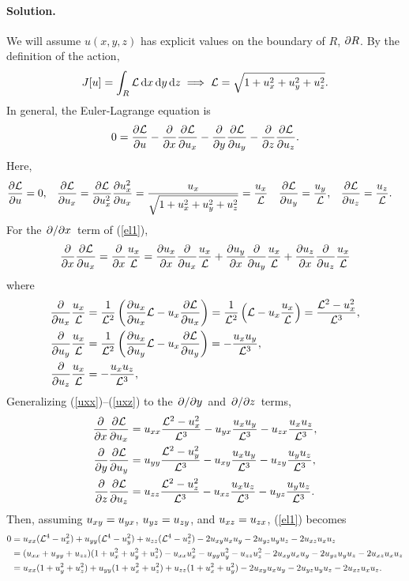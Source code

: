 \documentclass[11pt]{article}
\newcommand{\refeq}[1]{(\ref{#1})}
\newcommand{\beq}{\begin{equation*}}
\newcommand{\eeq}{\end{equation*}}
\newcommand{\beqn}{\begin{equation}}
\newcommand{\eeqn}{\end{equation}}
\newenvironment{solution}
{
    \paragraph{Solution.}
    \ignorespaces
}
{
}
\begin{document}
\begin{solution}
	We will assume $u(x, y, z)$ has explicit values on the boundary of $R$, $\partial R$.  By the definition of the action,
	\beq
		J[u] = \intr \Ld \dr \implies \Ld = \sqrt{1 + \ux^2 + \uy^2 + \uz^2}.
	\eeq
	In general, the Euler-Lagrange equation is
	\beqn \label{el1}
		0 = \pdv{\Ld}{u} - \pdv{}{x} \pdv{\Ld}{\ux} - \pdv{}{y} \pdv{\Ld}{\uy} - \pdv{}{z} \pdv{\Ld}{\uz}.
	\eeqn
	Here,
	\begin{align*}
		\pdv{\mathcal{L}}{u} &= 0, &
		\pdv{\mathcal{L}}{u_x} &= \pdv{\mathcal{L}}{u_x^2} \pdv{u_x^2}{u_x} = \frac{u_x}{\sqrt{1 + u_x^2 + u_y^2 + u_z^2}} = \frac{u_x}{\mathcal{L}} &
		\pdv{\mathcal{L}}{u_y} &= \frac{u_y}{\mathcal{L}}, &
		\pdv{\mathcal{L}}{u_z} &= \frac{u_z}{\mathcal{L}}.
	\end{align*}
	For the $\pdv*{}{x}$ term of \refeq{el1},
	\beq
		\pdv{}{x} \pdv{\Ld}{\ux} = \pdv{}{x} \frac{\ux}{\Ld} = \pdv{\ux}{x} \pdv{}{\ux} \frac{\ux}{\Ld} + \pdv{\uy}{x} \pdv{}{\uy} \frac{\ux}{\Ld} + \pdv{\uz}{x} \pdv{}{\uz} \frac{\ux}{\Ld}
	\eeq
	where
	\begin{align}
		\pdv{}{u_x} \frac{u_x}{\mathcal{L}} &= \frac{1}{\mathcal{L}^2} \left(\pdv{u_x}{u_x} \mathcal{L} - u_x \pdv{\mathcal{L}}{u_x} \right) = \frac{1}{\mathcal{L}^2} \left( \mathcal{L} - u_x \frac{u_x}{\mathcal{L}} \right) = \frac{\mathcal{L}^2 - u_x^2}{\mathcal{L}^3}, \label{uxx} \\
		\pdv{}{u_y} \frac{u_x}{\mathcal{L}} &= \frac{1}{\mathcal{L}^2} \left(\pdv{u_x}{u_y} \mathcal{L} - u_x \pdv{\mathcal{L}}{u_y} \right) = -\frac{u_x u_y}{\mathcal{L}^3}, \\
		\pdv{}{u_z} \frac{u_x}{\mathcal{L}} &= -\frac{u_x u_z}{\mathcal{L}^3}, \label{uxz}
	\end{align}
	Generalizing \refeq{uxx}--\refeq{uxz} to the $\pdv*{}{y}$ and $\pdv*{}{z}$ terms,
	\begin{align*}
		\pdv{}{x} \pdv{\mathcal{L}}{u_x} &= u_{xx} \frac{\mathcal{L}^2 - u_x^2}{\mathcal{L}^3} - u_{yx} \frac{u_x u_y}{\mathcal{L}^3} - u_{zx} \frac{u_x u_z}{\mathcal{L}^3}, \\
		\pdv{}{y} \pdv{\mathcal{L}}{u_y} &= u_{yy} \frac{\mathcal{L}^2 - u_y^2}{\mathcal{L}^3} - u_{xy} \frac{u_x u_y}{\mathcal{L}^3} - u_{zy} \frac{u_y u_z}{\mathcal{L}^3}, \\
		\pdv{}{z} \pdv{\mathcal{L}}{u_z} &= u_{zz} \frac{\mathcal{L}^2 - u_z^2}{\mathcal{L}^3} - u_{xz} \frac{u_x u_z}{\mathcal{L}^3} - u_{yz} \frac{u_y u_z}{\mathcal{L}^3}.
	\end{align*}
	Then, assuming $u_{xy} = u_{yx}$, $u_{yz} = u_{zy}$, and $u_{xz} = u_{zx}$, \refeq{el1} becomes
	\begin{align*}
		0 &= u_{xx} (\mathcal{L}^4 - u_x^2) + u_{yy} (\mathcal{L}^4 - u_y^2) + u_{zz} (\mathcal{L}^4 - u_z^2) - 2 u_{xy} u_x u_y - 2 u_{yz} u_y u_z - 2 u_{xz} u_x u_z \\
		&= (u_{xx} + u_{yy} + u_{zz}) (1 + u_x^2 + u_y^2 + u_z^2) - u_{xx} u_x^2 - u_{yy} u_y^2 - u_{zz} u_z^2 - 2 u_{xy} u_x u_y - 2 u_{yz} u_y u_z - 2 u_{xz} u_x u_z \\
		&= u_{xx} (1 + u_y^2 + u_z^2) + u_{yy} (1 + u_x^2 + u_z^2) + u_{zz}(1 + u_x^2 + u_y^2) - 2 u_{xy} u_x u_y - 2 u_{yz} u_y u_z - 2 u_{xz} u_x u_z.
	\end{align*}
\end{solution}
\end{document}
